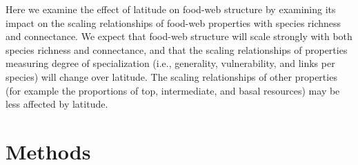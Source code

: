 
Here we examine the effect of latitude on food-web structure by examining
its impact on the scaling relationships of food-web properties with species
richness and connectance. We expect that food-web structure will scale strongly
with both species richness and connectance, and that the scaling relationships
of properties measuring degree of specialization (i.e., generality, vulnerability, and
links per species) will change over latitude. The scaling relationships of other
properties (for example the proportions of top, intermediate, and basal resources) may
be less affected by latitude.


\section*{Methods}

